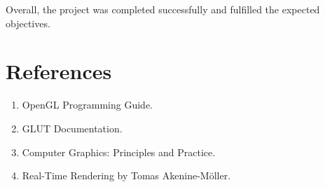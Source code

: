 \documentclass[12pt,a4paper]{report}
\begin{document}
Overall, the project was completed successfully and fulfilled the expected objectives.

\chapter{References}

\begin{enumerate}
    \item OpenGL Programming Guide.
    \item GLUT Documentation.
    \item Computer Graphics: Principles and Practice.
    \item Real-Time Rendering by Tomas Akenine-Möller.
\end{enumerate}
\end{document}
